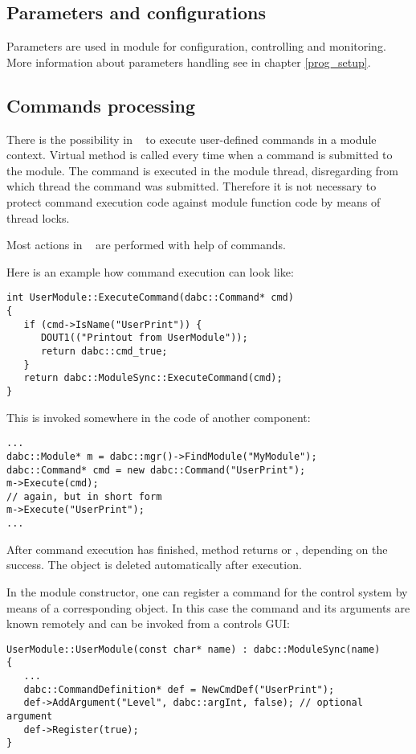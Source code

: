 \subsection{Parameters and configurations}

Parameters are used in module for configuration, controlling and monitoring.
More information about parameters handling see in chapter \ref{prog_setup}.


\subsection{Commands processing}

There is the possibility in \dabc~ to execute user-defined commands in a module context.
Virtual method  is called every time when a command is submitted
to the module. The command is  executed in the module thread,
disregarding from which thread the command was submitted. 
Therefore it is not necessary to protect command execution code against
module function code by means of thread locks.

Most actions in \dabc~ are performed with help of commands. 

Here is an example how command execution can look like:
\begin{small}
\begin{verbatim}
int UserModule::ExecuteCommand(dabc::Command* cmd) 
{
   if (cmd->IsName("UserPrint")) {
      DOUT1(("Printout from UserModule"));
      return dabc::cmd_true;
   }
   return dabc::ModuleSync::ExecuteCommand(cmd);
}
\end{verbatim}
\end{small}

This is invoked somewhere in the code of another component:
\begin{small}
\begin{verbatim}
...
dabc::Module* m = dabc::mgr()->FindModule("MyModule"); 
dabc::Command* cmd = new dabc::Command("UserPrint");
m->Execute(cmd);
// again, but in short form
m->Execute("UserPrint");
...
\end{verbatim}
\end{small}
After command execution has finished, 
method  returns  or  ,
depending on the success. The  object 
is deleted automatically after execution.  

In the module constructor, one can register a command 
for the control system by means of a corresponding 
 object. 
In this case the command and its arguments are known
remotely and can be invoked from a controls GUI:
\begin{small}
\begin{verbatim}
UserModule::UserModule(const char* name) : dabc::ModuleSync(name) 
{
   ...
   dabc::CommandDefinition* def = NewCmdDef("UserPrint");
   def->AddArgument("Level", dabc::argInt, false); // optional argument
   def->Register(true);
}
\end{verbatim}
\end{small}


